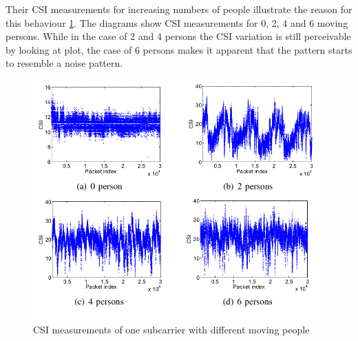 \documentclass[conference]{IEEEtran}
\begin{document}
Their CSI measurements for increasing numbers of people illustrate the reason for this behaviour \ref{figFrogeyeCsiVariation}. The diagrams show CSI measurements for 0, 2, 4 and 6 moving persons. While in the case of 2 and 4 persons the CSI variation is still perceivable by looking at plot, the case of 6 persons makes it apparent that the pattern starts to resemble a noise pattern.
\begin{figure}[htbp]
\centerline{\includegraphics[scale=0.6]{figFrogeyeCsiVariation.png}}
\caption{CSI measurements of one subcarrier with different moving people \cite{Xi}}
\label{figFrogeyeCsiVariation}
\end{figure}
\end{document}
